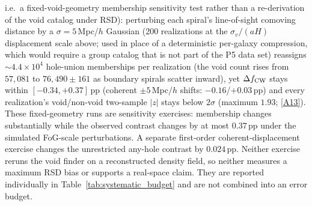 \documentclass[twocolumn,linenumbers]{aastex702}
\newcommand{\repoBase}{https://github.com/Hubify-Projects/bigbounce/blob/main}
\begin{document}
i.e.\ a fixed-void-geometry membership sensitivity test rather than a
re-derivation of the void catalog under RSD):
perturbing each spiral's line-of-sight comoving distance by a
$\sigma\!=\!5$\,Mpc/$h$ Gaussian (200 realizations at the
$\sigma_v/(aH)$ displacement scale above; used in place of a
deterministic per-galaxy compression, which would require a group
catalog that is not part of the P5 data set) reassigns
$\sim\!4.4\times10^{4}$ hole-union memberships per realization (the
void count rises from $57{,}081$ to $76{,}490 \pm 161$ as boundary
spirals scatter inward), yet $\Delta f_{\rm CW}$ stays within
$[-0.34, +0.37]$\,pp (coherent $\pm 5$\,Mpc/$h$ shifts:
$-0.16$/$+0.03$\,pp) and every realization's void/non-void two-sample
$|z|$ stays below $2\sigma$ (maximum $1.93$;
\href{\repoBase/pipelines/p5\_desi\_chirality/outputs/26\_r27conf\_ess\_recomputes.json}{[A13]}).
These fixed-geometry runs are sensitivity exercises: membership changes
substantially while the observed contrast changes by at most $0.37$\,pp
under the simulated FoG-scale perturbations. A separate first-order
coherent-displacement exercise changes the unrestricted any-hole
contrast by $0.024$\,pp. Neither exercise reruns the void finder on a
reconstructed density field, so neither measures a maximum RSD bias or
supports a real-space claim. They are reported individually in
Table~\ref{tab:systematic_budget} and are not combined into an error
budget.
\end{document}
